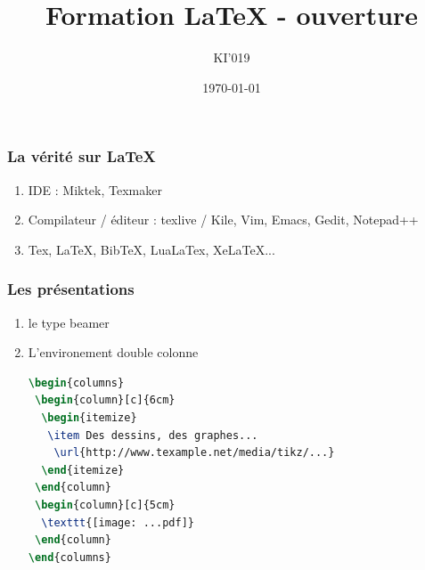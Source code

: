 \documentclass{beamer}
\title{Formation LaTeX - ouverture}
\date{\today}
\author{KI'019}
\begin{document}
\begin{frame}
    \titlepage
\end{frame}

\begin{frame}
    \frametitle{La vérité sur LaTeX}
    \begin{enumerate}
        \item<1-> IDE : Miktek, Texmaker
        \item<2-> Compilateur / éditeur : texlive / Kile, Vim, Emacs, Gedit, Notepad++     
        \item<3-> Tex, LaTeX, BibTeX, LuaLaTex, XeLaTeX...
    \end{enumerate}
\end{frame}

\begin{frame}[fragile]
    \frametitle{Les présentations}
    \begin{enumerate}
        \item<1-> le type beamer
        \item<2-> L'environement double colonne
        \begin{lstlisting}[language=TeX]
\begin{columns}
 \begin{column}[c]{6cm}
  \begin{itemize}
   \item Des dessins, des graphes...
    \url{http://www.texample.net/media/tikz/...}
  \end{itemize}
 \end{column}
 \begin{column}[c]{5cm}
  \texttt{[image: ...pdf]}
 \end{column}
\end{columns}
        \end{lstlisting}
    \end{enumerate}
\end{frame}
\end{document}
